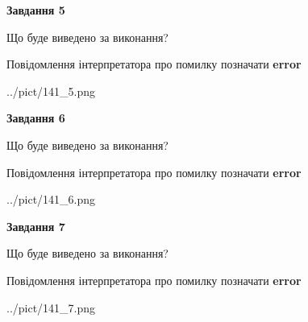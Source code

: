 \documentclass[10pt, ukrainian]{article}
\begin{document}
{\begin {large}
{\begin {center}\textbf{Завдання 5}\end {center}}\par
Що буде виведено за виконання? \par
Повідомлення інтерпретатора про помилку позначати \textbf{error}

\begin{center}
	{../pict/141_5.png}
\end{center}
\newpage

{\begin {center}\textbf{Завдання 6}\end {center}}\par
Що буде виведено за виконання? \par
Повідомлення інтерпретатора про помилку позначати \textbf{error}

\begin{center}
	{../pict/141_6.png}
\end{center}
\newpage

{\begin {center}\textbf{Завдання 7}\end {center}}\par
Що буде виведено за виконання? \par
Повідомлення інтерпретатора про помилку позначати \textbf{error}

\begin{center}
	{../pict/141_7.png}
\end{center}
\newpage

\end {large}}
\end{document}

